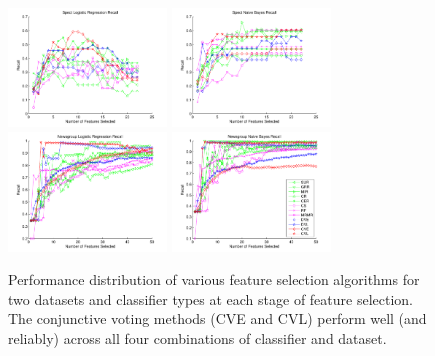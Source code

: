 \begin{figure}[tbp!]
\centering
\includegraphics[width=0.375\textwidth]{./figures/linegraphs/SpectLogisticRegressionRecall.pdf}
\includegraphics[width=0.375\textwidth]{./figures/linegraphs/SpectNaiveBayesRecall.pdf}\\
\includegraphics[width=0.375\textwidth]{./figures/linegraphs/NewsgroupLogisticRegressionRecall.pdf}
\includegraphics[width=0.375\textwidth]{./figures/linegraphs/NewsgroupNaiveBayesRecall.pdf}
\caption{\footnotesize Performance distribution of various feature selection algorithms for two datasets and classifier types at each stage of feature selection.  The conjunctive voting methods (CVE and CVL)
perform well (and reliably) across all four combinations of classifier and dataset.}
\label{fig:perf_vs_fs_alg}
\end{figure}

